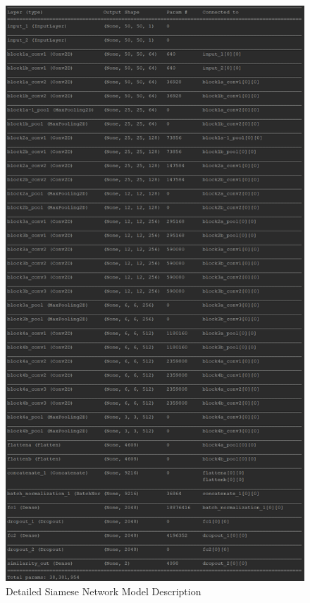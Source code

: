 \documentclass[11pt]{article}
\begin{document}
\begin{figure}
	\begin{center}
	\includegraphics[width=4.8in]{ModelSummary.png}
	\caption{Detailed Siamese Network Model Description}
	\end{center}
\end{figure}
\end{document}
